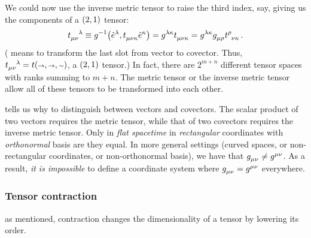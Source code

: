 We could now use the inverse metric tensor to raise the third index, say, giving us the components of a $\torder 21$ tensor:
%
\begin{equation}\label{eq:exampleofinversemetrictransformationofatensor}
  \tensor{t}{_\mu_\nu^\lambda} \defas \invmet\vat{\tbcov\lambda,\tensor{t}{_\mu_\nu_\kappa}\tbcov\kappa}
                               = \tinvmet\lambda\kappa\tensor{t}{_\mu_\nu_\kappa}
                               = \tinvmet\lambda\kappa\tmetric\mu\rho\tensor{t}{^\rho_\nu_\kappa}\,.
\end{equation}
%
( means to transform the last slot from vector to covector. Thus, $\tensor{t}{_\mu_\nu^\lambda} = t\vat{\vslot,\vslot,\cslot}$, a $\torder 21$ tensor.)
%
In fact, there are $2^{m + n}$ different tensor spaces with ranks summing to $m + n$. The metric tensor or the inverse metric tensor allow all of these tensors to be transformed into each other.

  tells us why to distinguish between vectors and covectors. The scalar product of two vectors requires the metric tensor, while that of two covectors requires the inverse metric tensor. Only in \emph{flat spacetime} in \emph{rectangular} coordinates with \emph{orthonormal} basis are they equal. In more general settings (curved spaces, or non-rectangular coordinates, or non-orthonormal basis), we have that $\tmetric\mu\nu\neq\tinvmet\mu\nu$. As a result, \emph{it is impossible} to define a coordinate system where $\tmetric\mu\nu = \tinvmet\mu\nu$ everywhere.


\subsubsection{Tensor contraction}
%
 as mentioned, contraction changes the dimensionality of a tensor by lowering its order. 

